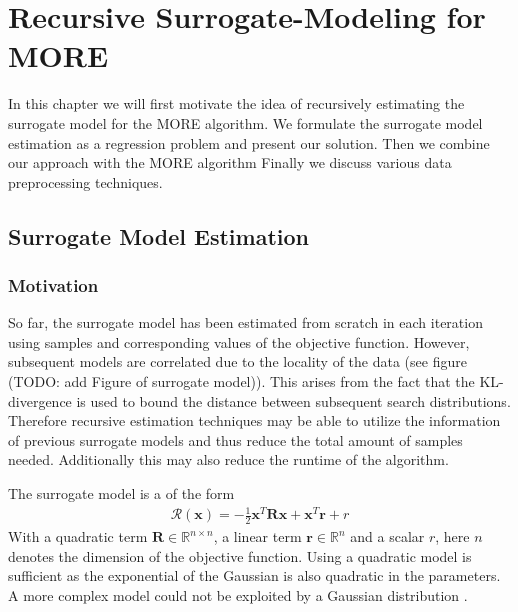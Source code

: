 
\chapter{Recursive Surrogate-Modeling for MORE}
In this chapter we will first motivate the idea of recursively
estimating the surrogate model for the MORE algorithm.
We formulate the surrogate model estimation
as a regression problem and present our solution.
Then we combine our approach with the MORE algorithm
Finally we discuss various data preprocessing techniques.

\section{Surrogate Model Estimation}

\subsection{Motivation}
So far, the surrogate model has been estimated from scratch in each
iteration using samples and corresponding
values of the objective function. 
However, subsequent models are correlated
due to the locality of the data (see figure
(TODO: add Figure of surrogate model)).
This arises from the fact that the KL-divergence is
used to bound the distance between
subsequent search distributions. Therefore recursive estimation
techniques may be able to utilize the information of previous
surrogate models and thus reduce the total amount of samples needed.
Additionally this may also reduce the runtime of the algorithm.

The surrogate model is a of the form
\begin{align}
  \label{surrogate}
  \mathcal{R}(\mathbf{x}) = -\frac{1}{2} \mathbf{x}^T \mathbf{R} \mathbf{x}
  + \mathbf{x}^T \mathbf{r} + r 
\end{align}
With a quadratic term $\mathbf{R} \in \mathbb{R}^{n \times n}$,
a linear term $\mathbf{r} \in \mathbb{R}^{n}$ and a scalar $r$,
here $n$ denotes the dimension of the objective function.
Using a quadratic model is sufficient as the exponential of the
Gaussian is also quadratic in the parameters.
A more complex model could not be exploited by
a Gaussian distribution \citep{abdolmaleki2015model}.




